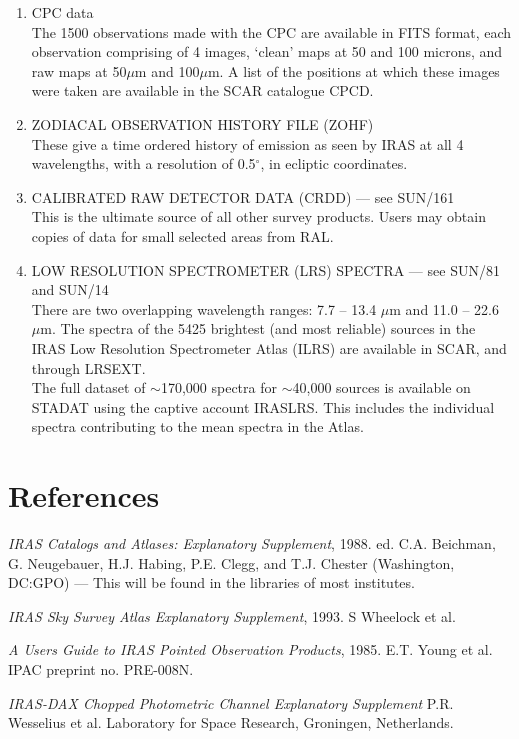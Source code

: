 \begin{enumerate}
\begin{enumerate}
	\end{enumerate}
\item CPC data \\
         The 1500 observations made with the CPC are available in FITS format,
         each observation comprising of 4 images, `clean' maps at 50 and 100
         microns, and raw maps at 50$\mu$m and 100$\mu$m.
         A list of the positions at which these images were taken are available
         in the SCAR catalogue CPCD.
\item ZODIACAL OBSERVATION HISTORY FILE (ZOHF) \\
         These give a time ordered history of emission as seen by IRAS at all
         4 wavelengths,
         with a resolution of 0.5$^{\circ}$, in ecliptic coordinates.
\item CALIBRATED RAW DETECTOR DATA (CRDD) --- see SUN/161\\
	This is the ultimate source of all other survey products.
	Users may obtain copies of data for small selected areas from RAL.
\item LOW RESOLUTION SPECTROMETER (LRS) SPECTRA --- see SUN/81 and SUN/14\\
There are two overlapping wavelength ranges: 7.7 -- 13.4 $\mu$m and
11.0 -- 22.6 $\mu$m.
The spectra of the 5425 brightest (and most reliable) sources in the IRAS Low
Resolution Spectrometer Atlas (ILRS) are available in SCAR, and through
LRSEXT.\\
The full dataset of $\sim$170,000 spectra for $\sim$40,000 sources is
available on STADAT using the captive account IRASLRS.
This includes the individual spectra contributing to the mean spectra in
the Atlas.
\end{enumerate}

\section{References}
{\em IRAS Catalogs and Atlases: Explanatory Supplement}, 1988. ed. C.A.
Beichman, G. Neugebauer, H.J. Habing, P.E. Clegg, and T.J. Chester (Washington,
DC:GPO) --- This will be found in the libraries of most institutes.

{\em IRAS Sky Survey Atlas Explanatory Supplement}, 1993. S Wheelock et al.

{\em A Users Guide to IRAS Pointed Observation Products}, 1985. E.T. Young et
al. IPAC preprint no. PRE-008N.

{\em IRAS-DAX Chopped Photometric Channel Explanatory Supplement} P.R. Wesselius
 et al. Laboratory for Space Research, Groningen, Netherlands.

